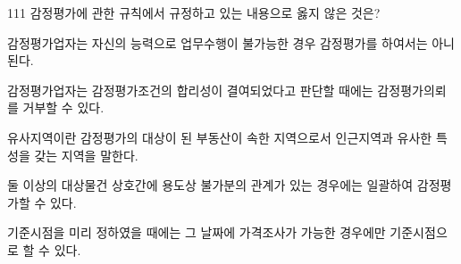 \begin{question}{111}
감정평가에 관한 규칙에서 규정하고 있는 내용으로 옳지 않은 것은?
\begin{choices}
  \item 감정평가업자는 자신의 능력으로 업무수행이 불가능한 경우 감정평가를 하여서는 아니 된다.
  \item 감정평가업자는 감정평가조건의 합리성이 결여되었다고 판단할 때에는 감정평가의뢰를 거부할 수 있다.
  \item 유사지역이란 감정평가의 대상이 된 부동산이 속한 지역으로서 인근지역과 유사한 특성을 갖는 지역을 말한다.
  \item 둘 이상의 대상물건 상호간에 용도상 불가분의 관계가 있는 경우에는 일괄하여 감정평가할 수 있다.
  \item 기준시점을 미리 정하였을 때에는 그 날짜에 가격조사가 가능한 경우에만 기준시점으로 할 수 있다.
\end{choices}
\end{question}
